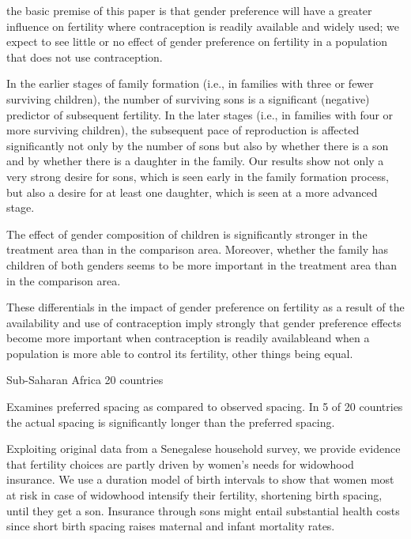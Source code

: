 the basic premise of this paper is that gender preference will have a greater influence on fertility where contraception is readily available and widely used; we expect to see little or no effect of gender preference on fertility in a population that does not use contraception.

In the earlier stages of family formation (i.e., in families with three or fewer surviving children), the number of surviving sons is a significant (negative) predictor of subsequent fertility. In the later stages (i.e., in families with four or more surviving children), the subsequent pace of reproduction is affected significantly not only by the number of sons but also by whether there is a son and by whether there is a daughter in the family. Our results show not only a very strong desire for sons, which is seen early in the family formation process, but also a desire for at least one daughter, which is seen at a more advanced stage.

The effect of gender composition of children is significantly stronger in the treatment area than in the comparison area. Moreover, whether the family has children of both genders seems to be more important in the treatment area than in the comparison area.

These differentials in the impact of gender preference on fertility as a result of the availability and use of contraception imply strongly that gender preference effects become more important when contraception is readily availableand when a population is more able to control its fertility, other things being equal.

\citep{Rafalitnanana2000} 

Sub-Saharan Africa 20 countries

Examines preferred spacing as compared to observed spacing. In 5 of 20 countries the
actual spacing is significantly longer than the preferred spacing.


\citep{Lambert2016}

Exploiting original data from a Senegalese household survey, we provide evidence that fertility choices are partly driven by women's needs for widowhood insurance. We use a duration model of birth intervals to show that women most at risk in case of widowhood intensify their fertility, shortening birth spacing, until they get a son. Insurance through sons might entail substantial health costs since short birth spacing raises maternal and infant mortality rates.

\citep{Jayachandran2017}

